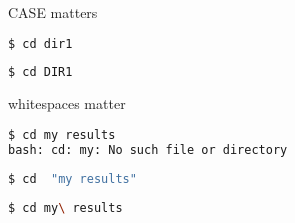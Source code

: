 \documentclass{beamer}
\begin{document}
\begin{frame}[fragile]
 \begin{center}
    \huge{CASE matters}\\
    \end{center}
\begin{lstlisting}[language=bash]
$ cd dir1
\end{lstlisting}


\begin{lstlisting}[language=bash]
$ cd DIR1
\end{lstlisting}

\end{frame}


\begin{frame}[fragile]
 \begin{center}
    \huge{whitespaces matter}\\
    \end{center}
\begin{lstlisting}[language=bash]
$ cd my results
bash: cd: my: No such file or directory
\end{lstlisting}


\begin{lstlisting}[language=bash]
$ cd  "my results"
\end{lstlisting}

\begin{lstlisting}[language=bash]
$ cd my\ results
\end{lstlisting}
  
\end{frame}
\end{document}
